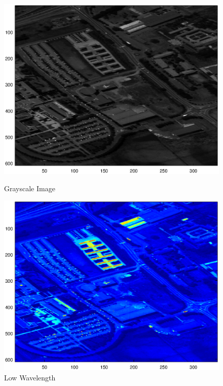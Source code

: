 \documentclass[12pt]{article}
\begin{document}
\begin{figure}
\begin{minipage}{.45\textwidth}
  \includegraphics[width=\linewidth]{./Images/paviaFull/gray.eps}
  \caption{Grayscale Image}
  \label{PaviaGray}
\end{minipage}\hfill
\begin{minipage}{.45\textwidth}
  \includegraphics[width=\linewidth]{./Images/paviaFull/band21.eps}
  \caption{Low Wavelength}
  \label{PaviaLow}
\end{minipage}
\end{figure}
\end{document}
